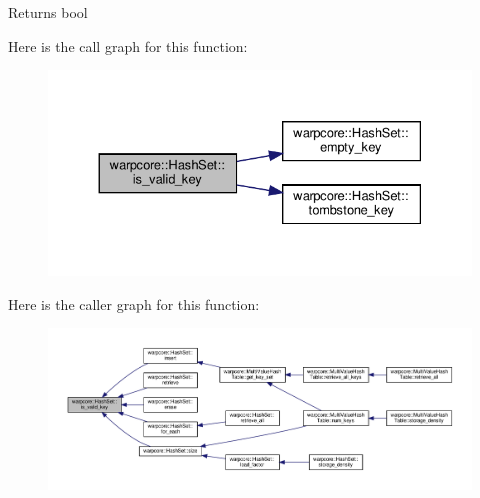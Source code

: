\begin{DoxyReturn}{Returns}
{\ttfamily bool} 
\end{DoxyReturn}
Here is the call graph for this function\+:
\nopagebreak
\begin{figure}[H]
\begin{center}
\leavevmode
\includegraphics[width=330pt]{classwarpcore_1_1HashSet_a529de8c2b747588ef825661ba12b4c25_cgraph}
\end{center}
\end{figure}
Here is the caller graph for this function\+:
\nopagebreak
\begin{figure}[H]
\begin{center}
\leavevmode
\includegraphics[width=350pt]{classwarpcore_1_1HashSet_a529de8c2b747588ef825661ba12b4c25_icgraph}
\end{center}
\end{figure}
\mbox{\label{classwarpcore_1_1HashSet_a7ad4ad097ae0e332c4f24d867e6c411f}} 
